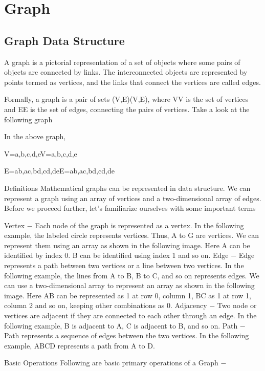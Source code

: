 \section{Graph}

\subsection{Graph Data Structure}

A graph is a pictorial representation of a set of objects where some pairs of objects are connected by links. The interconnected objects are represented by points termed as vertices, and the links that connect the vertices are called edges.

Formally, a graph is a pair of sets (V,E)(V,E), where VV is the set of vertices and EE is the set of edges, connecting the pairs of vertices. Take a look at the following graph



In the above graph,

V=a,b,c,d,eV=a,b,c,d,e

E=ab,ac,bd,cd,deE=ab,ac,bd,cd,de

Definitions
Mathematical graphs can be represented in data structure. We can represent a graph using an array of vertices and a two-dimensional array of edges. Before we proceed further, let's familiarize ourselves with some important terms

Vertex − Each node of the graph is represented as a vertex. In the following example, the labeled circle represents vertices. Thus, A to G are vertices. We can represent them using an array as shown in the following image. Here A can be identified by index 0. B can be identified using index 1 and so on.
Edge − Edge represents a path between two vertices or a line between two vertices. In the following example, the lines from A to B, B to C, and so on represents edges. We can use a two-dimensional array to represent an array as shown in the following image. Here AB can be represented as 1 at row 0, column 1, BC as 1 at row 1, column 2 and so on, keeping other combinations as 0.
Adjacency − Two node or vertices are adjacent if they are connected to each other through an edge. In the following example, B is adjacent to A, C is adjacent to B, and so on.
Path − Path represents a sequence of edges between the two vertices. In the following example, ABCD represents a path from A to D.


Basic Operations
Following are basic primary operations of a Graph −

